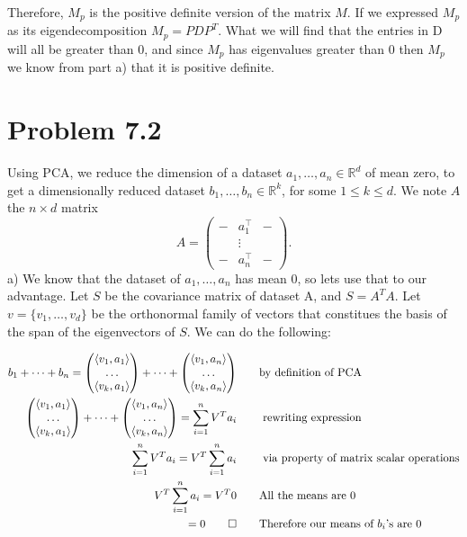 \documentclass[12pt,twoside]{article}
\newcommand{\R}{\mathbb{R}}
\begin{document}
Therefore, $M_p$ is the positive definite version of the matrix $M$.  If we expressed $M_p$ as its eigendecomposition $M_p=PDP^T$. What we will find that the entries in D will all be  greater than $0$, and since $M_p$ has eigenvalues greater than $0$ then $M_p$ we know from part a) that it is positive definite. 

\vspace{5mm}

\section{Problem 7.2}
	Using PCA, we reduce the dimension of a dataset $a_1, \dots, a_n \in \R^d$ of mean zero, to get a dimensionally reduced dataset $b_1 , \dots, b_n \in \R^k$, for some $1 \leq k \leq d$. We note $A$ the $n \times d$ matrix $$
    A = \begin{pmatrix}
        - & a_1^\top & - \\
        &\vdots& \\
        - & a_n^\top & -
    \end{pmatrix}.$$
a) We know that the dataset of $a_1,\dots,a_n$ has mean 0, so lets use that to our advantage. Let $S$ be the covariance matrix of dataset A, and $S=A^TA$. Let $v=\{v_1,\dots,v_d\}$ be the orthonormal family of vectors that constitues the basis of the span of the eigenvectors of $S$. We can do the following:

\begin{equation}
    \begin{split}
        b_1 + \dots + b_n = \begin{pmatrix} \langle v_1,a_1 \rangle \\ \dots \\ \langle v_k, a_1\rangle \end{pmatrix} + \dots + \begin{pmatrix} \langle v_1,a_n \rangle \\ \dots \\ \langle v_k, a_n\rangle \end{pmatrix}
        & \qquad \text{by definition of PCA}\\
        \begin{pmatrix} \langle v_1,a_1 \rangle \\ \dots \\ \langle v_k, a_1\rangle \end{pmatrix} + \dots + \begin{pmatrix} \langle v_1,a_n \rangle \\ \dots \\ \langle v_k, a_n\rangle \end{pmatrix} = \sum_{i=1}^n V^Ta_i & \qquad \text{ rewriting expression}\\ 
        \sum_{i=1}^n V^Ta_i = V^T\sum_{i=1}^n a_i & \qquad \text{ via property of matrix scalar operations}\\ 
        V^T\sum_{i=1}^n a_i = V^T 0 & \qquad \text{All the means are 0}\\
        = 0 \qed &\qquad \text{Therefore our means of $b_i$'s are 0}
    \end{split}
\end{equation}
\end{document}

